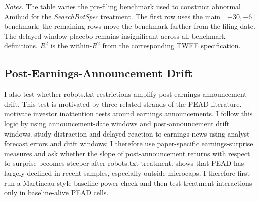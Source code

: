 \documentclass[11pt]{article}
\newcommand{\TableNote}[1]{%
    \par\vspace{0.35em}
    \begin{minipage}{0.96\textwidth}
    \footnotesize\emph{Notes.} #1
    \end{minipage}
}
\begin{document}
\begin{table}[!htbp]
\centering
\caption{Pre-Filing Benchmark Robustness for Abnormal Amihud}
\label{tab:amihud_benchmark_robustness}
\begin{threeparttable}
\TableNote{The table varies the pre-filing benchmark used to construct
abnormal Amihud for the \textit{SearchBotSpec} treatment. The first row
uses the main \([-30,-6]\) benchmark; the remaining rows move the benchmark
farther from the filing date. The delayed-window placebo remains
insignificant across all benchmark definitions. \(R^2\) is the within-\(R^2\)
from the corresponding TWFE specification.}
\end{threeparttable}
\end{table}

\subsection{Post-Earnings-Announcement Drift}
\label{subsec:robots_pead}

I also test whether robots.txt restrictions amplify
post-earnings-announcement drift.  This test is motivated by three related
strands of the PEAD literature.  \citet{DellaVignaPollet2009} motivate
investor inattention tests around earnings announcements.  I follow this
logic by using announcement-date windows and post-announcement drift
windows.  \citet{HirshleiferLimTeoh2009} study distraction and delayed
reaction to earnings news using analyst forecast errors and drift windows;
I therefore use paper-specific earnings-surprise measures and ask whether
the slope of post-announcement returns with respect to surprise becomes
steeper after robots.txt treatment.  \citet{Martineau2022} shows that PEAD has largely
declined in recent samples, especially outside microcaps.  I therefore
first run a Martineau-style baseline power check and then test treatment
interactions only in baseline-alive PEAD cells.
\end{document}
